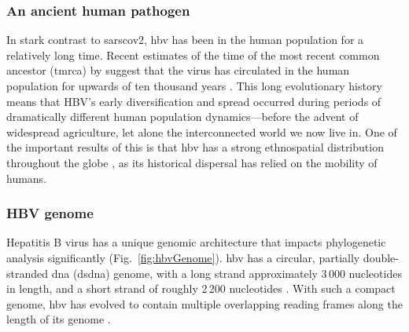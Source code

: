 \subsubsection{An ancient human pathogen}
In stark contrast to \gls{sarscov2}, \gls{hbv} has been in the human population for a relatively long time.
Recent estimates of the time of the most recent common ancestor (\gls{tmrca}) by \citet{kocher2021ten} suggest that the virus has circulated in the human population for upwards of ten thousand years \citep{kocher2021ten}.
This long evolutionary history means that HBV's early diversification and spread occurred during periods of dramatically different human population dynamics---before the advent of widespread agriculture, let alone the interconnected world we now live in. 
One of the important results of this is that \gls{hbv} has a strong ethnospatial distribution throughout the globe \citep{sunbul2014hepatitis}, as its historical dispersal has relied on the mobility of humans.



\subsubsection{HBV genome}
Hepatitis B virus has a unique genomic architecture that impacts phylogenetic analysis significantly (Fig.~\ref{fig:hbvGenome}).
\gls{hbv} has a circular, partially double-stranded \gls{dna} (ds\gls{dna}) genome, with a long strand approximately 3\,000 nucleotides in length, and a short strand of roughly 2\,200 nucleotides \citep{mcnaughton2019insights}.
With such a compact genome, \gls{hbv} has evolved to contain multiple overlapping reading frames along the length of its genome \citep{mcnaughton2019insights}.

